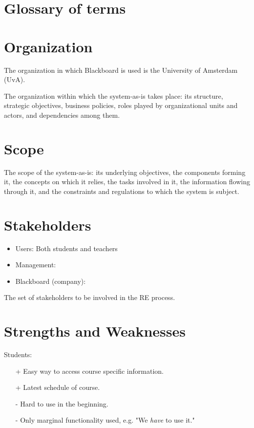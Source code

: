 \section{Glossary of terms}

\section{Organization}
The organization in which Blackboard is used is the University of Amsterdam (UvA). 

The organization within which the system-as-is takes place: its structure, strategic objectives,
business policies, roles played by organizational units and actors, and dependencies
among them.

\section{Scope}
The scope of the system-as-is: its underlying objectives, the components forming it, the
concepts on which it relies, the tasks involved in it, the information flowing through it,
and the constraints and regulations to which the system is subject.

\section{Stakeholders}
\begin{itemize}
	\item Users: Both students and teachers
	\item Management:
	\item Blackboard (company):
\end{itemize}

The set of stakeholders to be involved in the RE process.

\section{Strengths and Weaknesses}
Students:
\begin{itemize}
	\item[+] Easy way to access course specific information.
	\item[+] Latest schedule of course.
	\item[-] Hard to use in the beginning.
	\item[-] Only marginal functionality used, e.g. "We \textit{have} to use it."
\end{itemize}



